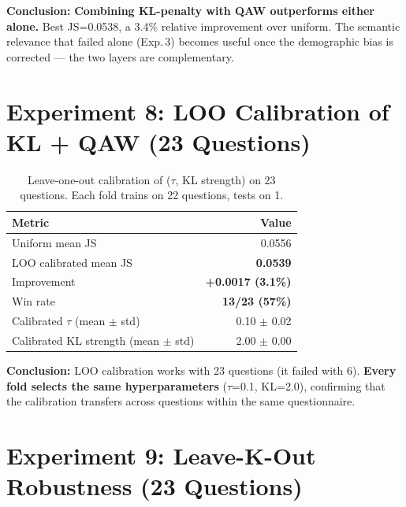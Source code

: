 \documentclass[10pt,a4paper]{article}
\begin{document}
\textbf{Conclusion:} \textbf{Combining KL-penalty with QAW outperforms either alone.} Best JS=0.0538, a 3.4\% relative improvement over uniform. The semantic relevance that failed alone (Exp.\,3) becomes useful once the demographic bias is corrected --- the two layers are complementary.

\section{Experiment 8: LOO Calibration of KL + QAW (23 Questions)}

\begin{table}[h]
\centering\small
\caption{Leave-one-out calibration of ($\tau$, KL strength) on 23 questions. Each fold trains on 22 questions, tests on 1.}
\begin{tabular}{@{}lr@{}}
\toprule
Metric & Value \\
\midrule
Uniform mean JS & 0.0556 \\
\rowcolor{best} LOO calibrated mean JS & \textbf{0.0539} \\
\rowcolor{best} Improvement & \textbf{+0.0017 (3.1\%)} \\
\rowcolor{best} Win rate & \textbf{13/23 (57\%)} \\
Calibrated $\tau$ (mean $\pm$ std) & 0.10 $\pm$ 0.02 \\
Calibrated KL strength (mean $\pm$ std) & 2.00 $\pm$ 0.00 \\
\bottomrule
\end{tabular}
\end{table}

\textbf{Conclusion:} LOO calibration works with 23 questions (it failed with 6). \textbf{Every fold selects the same hyperparameters} ($\tau$=0.1, KL=2.0), confirming that the calibration transfers across questions within the same questionnaire.

\section{Experiment 9: Leave-K-Out Robustness (23 Questions)}
\end{document}
